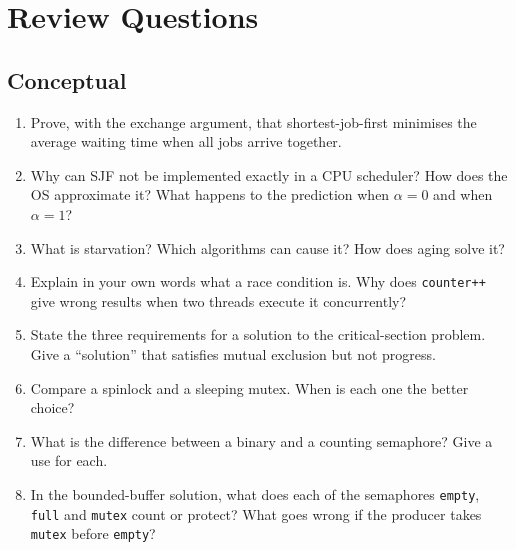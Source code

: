 \documentclass[11pt,a4paper]{article}
\begin{document}
\section{Review Questions}

\subsection*{Conceptual}
\begin{enumerate}[leftmargin=1.6em]
  \item Prove, with the exchange argument, that shortest-job-first minimises the average waiting time when all jobs arrive together.
  \item Why can SJF not be implemented exactly in a CPU scheduler? How does the OS approximate it? What happens to the prediction when $\alpha = 0$ and when $\alpha = 1$?
  \item What is starvation? Which algorithms can cause it? How does aging solve it?
  \item Explain in your own words what a race condition is. Why does \texttt{counter++} give wrong results when two threads execute it concurrently?
  \item State the three requirements for a solution to the critical-section problem. Give a ``solution'' that satisfies mutual exclusion but not progress.
  \item Compare a spinlock and a sleeping mutex. When is each one the better choice?
  \item What is the difference between a binary and a counting semaphore? Give a use for each.
  \item In the bounded-buffer solution, what does each of the semaphores \texttt{empty}, \texttt{full} and \texttt{mutex} count or protect? What goes wrong if the producer takes \texttt{mutex} before \texttt{empty}?
\end{enumerate}
\end{document}
